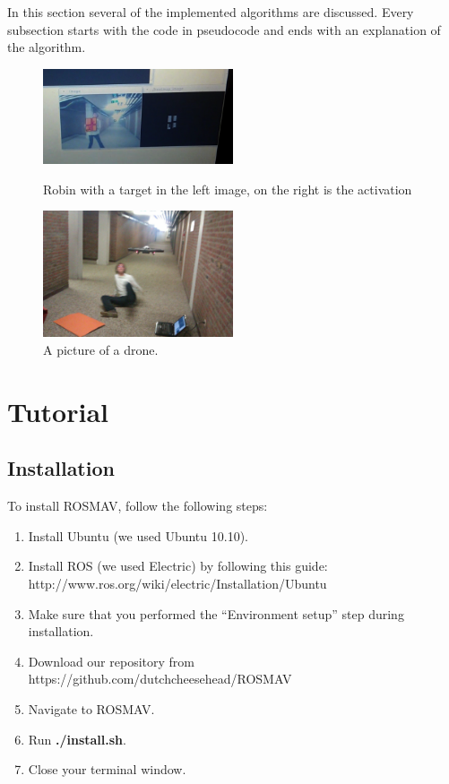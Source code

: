 \documentclass[a4paper,10pt]{article}
\begin{document}
In this section several of the implemented algorithms are discussed. Every subsection starts with the code in pseudocode and ends with an explanation of the algorithm. 

\begin{figure}[h!]
	\caption{Robin with a target in the left image, on the right is the activation}
	\centering
	\includegraphics[width=0.5\textwidth]{images/robinPresentActivation}
	\label{fig:robinPresentActivation}
\end{figure}

\begin{figure}[h!]
	\caption{A picture of a drone.}
	\centering
	\includegraphics[width=0.5\textwidth]{images/droneAttack}
\end{figure}

\section{Tutorial}
\subsection{Installation}
To install ROSMAV, follow the following steps:
\begin{enumerate}
\item Install Ubuntu (we used Ubuntu 10.10).

\item Install ROS (we used Electric) by following this guide: \\
      http://www.ros.org/wiki/electric/Installation/Ubuntu

\item Make sure that you performed the ``Environment setup'' step during installation.

\item Download our repository from
      https://github.com/dutchcheesehead/ROSMAV

\item Navigate to ROSMAV.

\item Run \textbf{./install.sh}.
\item Close your terminal window.
\end{enumerate}
\end{document}
